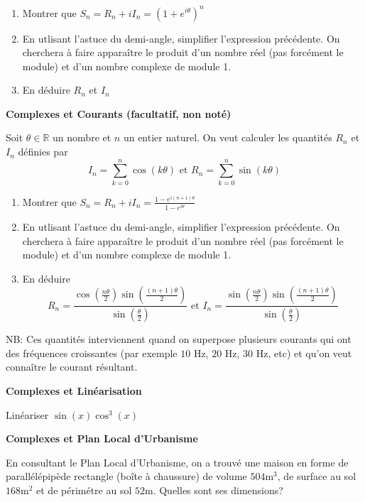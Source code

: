\documentclass[a4paper,12pt]{article}\usepackage[]{graphicx}\usepackage[]{color}
\begin{document}
\begin{enumerate}
\item Montrer que $\displaystyle S_n = R_n + i I_n = (1+e^{i\theta})^n$
\item En utlisant l'astuce du demi-angle, simplifier l'expression précédente. On cherchera à faire apparaître le produit d'un nombre réel (pas forcément le module) et d'un nombre complexe de module 1. 
\item En déduire $R_n$ et $I_n$
\end{enumerate}

\Exo \textbf{Complexes et Courants (facultatif, non noté)}

Soit $\theta \in \mathbb{R}$ un nombre et $n$ un entier naturel. On veut calculer les quantités $R_n$ et $I_n$ définies par 
\begin{equation*}
I_n  = \sum_{k=0}^n \cos(k\theta) \text{ et } R_n  = \sum_{k=0}^n \sin(k\theta)
\end{equation*}

\begin{enumerate}
\item Montrer que $\displaystyle S_n = R_n + i I_n = \frac{1 - e^{i(n+1)\theta}}{1 - e^{i\theta}}$
\item En utlisant l'astuce du demi-angle, simplifier l'expression précédente. On cherchera à faire apparaître le produit d'un nombre réel (pas forcément le module) et d'un nombre complexe de module 1. 
\item En déduire 
$$ R_n = \frac{\cos\left(\frac{n\theta}{2}\right)\sin\left(\frac{(n+1)\theta}{2}\right)}{\sin\left(\frac{\theta}{2}\right)} \text{ et } I_n = \frac{\sin\left(\frac{n\theta}{2}\right)\sin\left(\frac{(n+1)\theta}{2}\right)}{\sin\left(\frac{\theta}{2}\right)} $$
\end{enumerate}

NB: Ces quantités interviennent quand on superpose plusieurs courants qui ont des fréquences croissantes (par exemple $10$ Hz, $20$ Hz, $30$ Hz, etc) et qu'on veut connaître le courant résultant.

\Exo \textbf{Complexes et Linéarisation}

Linéariser $\sin(x)\cos^3(x)$

\Exo \textbf{Complexes et Plan Local d'Urbanisme}

En consultant le Plan Local d'Urbanisme, on a trouvé une maison en forme de parallélépipède rectangle (boîte à chaussure) de volume $504$m$^3$, de surface au sol $168$m$^2$ et de périmétre au sol $52$m. Quelles sont ses dimensions?
\end{document}
